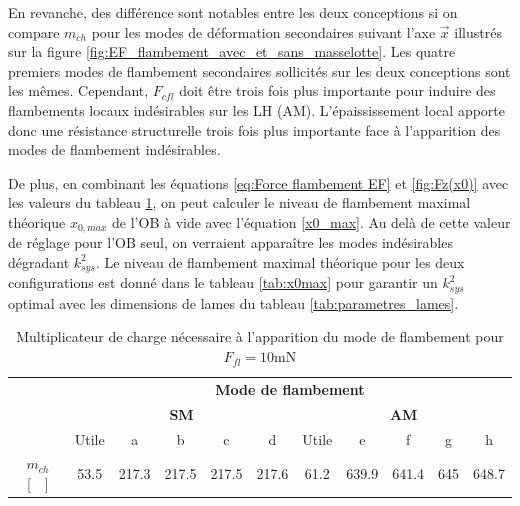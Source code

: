 En revanche, des différence sont notables entre les deux conceptions si on compare  $m_{ch}$ pour les modes de déformation secondaires suivant l'axe $\vec{x}$ illustrés sur la figure \ref{fig:EF_flambement_avec_et_sans_masselotte}. Les quatre premiers modes de flambement secondaires sollicités sur les deux conceptions sont les mêmes. Cependant, $F_{cfl}$ doit être trois fois plus importante pour induire des flambements locaux indésirables sur les LH (AM). L'épaississement local apporte donc une résistance structurelle trois fois plus importante face à l'apparition des modes de flambement indésirables. 

De plus, en combinant les équations \ref{eq:Force flambement EF} et \ref{fig:Fz(x0)} avec les valeurs du tableau \ref{tab:multiplicateur_de_charge_flambement}, on peut calculer le niveau de flambement maximal théorique $x_{0,max}$ de l'OB à vide avec l'équation \ref{x0_max}. Au delà de cette valeur de réglage pour l'OB seul, on verraient apparaître les modes indésirables dégradant $k_{sys}^2$. Le niveau de flambement maximal théorique pour les deux configurations est donné dans le tableau \ref{tab:x0max} pour garantir un $k_{sys}^2$ optimal avec les dimensions de lames du tableau \ref{tab:parametres_lames}.
\begin{table}[!htbp]
	\centering
		\begin{tabular}[t]{c|c|c|c|c|c|c|c|c|c|c|}
\cline{2-11} 
& \multicolumn{10}{c|}{\textbf{Mode de flambement}}\\
\cline{2-11} 
& \multicolumn{5}{c|}{\textbf{SM}} &  \multicolumn{5}{c|}{\textbf{AM}} \\
\cline{2-11} 
& Utile & a & b & c & d & Utile & e & f & g & h \\
\cline{2-11} \hline
\multicolumn{1}{|c|}{$m_{ch}$ [~~]} &
53.5 & 217.3	&	217.5	&	217.5	&	217.6	&
61.2 & 639.9	&	641.4	&	645		&	648.7 \\
\hline
		\end{tabular}
        \caption{Multiplicateur de charge nécessaire à l'apparition du mode de flambement pour $F_{fl} = 10$mN}
        \label{tab:multiplicateur_de_charge_flambement}
\end{table}        
